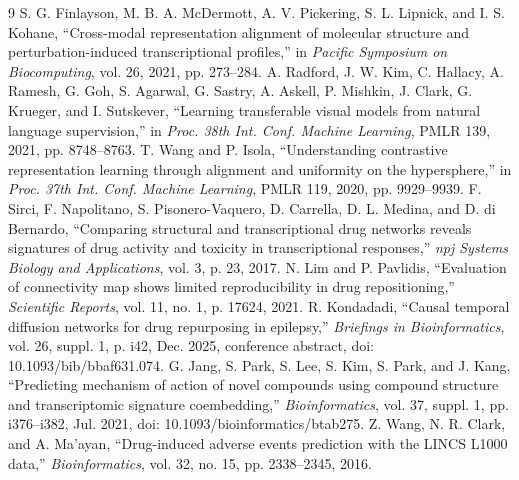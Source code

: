 \documentclass[conference]{IEEEtran}
\begin{document}
\begin{thebibliography}{9}
 S. G. Finlayson, M. B. A. McDermott, A. V. Pickering, S. L. Lipnick, and I. S. Kohane, ``Cross-modal representation alignment of molecular structure and perturbation-induced transcriptional profiles,'' in \emph{Pacific Symposium on Biocomputing}, vol. 26, 2021, pp. 273--284.
 A. Radford, J. W. Kim, C. Hallacy, A. Ramesh, G. Goh, S. Agarwal, G. Sastry, A. Askell, P. Mishkin, J. Clark, G. Krueger, and I. Sutskever, ``Learning transferable visual models from natural language supervision,'' in \emph{Proc. 38th Int. Conf. Machine Learning}, PMLR 139, 2021, pp. 8748--8763.
 T. Wang and P. Isola, ``Understanding contrastive representation learning through alignment and uniformity on the hypersphere,'' in \emph{Proc. 37th Int. Conf. Machine Learning}, PMLR 119, 2020, pp. 9929--9939.
 F. Sirci, F. Napolitano, S. Pisonero-Vaquero, D. Carrella, D. L. Medina, and D. di Bernardo, ``Comparing structural and transcriptional drug networks reveals signatures of drug activity and toxicity in transcriptional responses,'' \emph{npj Systems Biology and Applications}, vol. 3, p. 23, 2017.
 N. Lim and P. Pavlidis, ``Evaluation of connectivity map shows limited reproducibility in drug repositioning,'' \emph{Scientific Reports}, vol. 11, no. 1, p. 17624, 2021.
 R. Kondadadi, ``Causal temporal diffusion networks for drug repurposing in epilepsy,'' \emph{Briefings in Bioinformatics}, vol. 26, suppl. 1, p. i42, Dec. 2025, conference abstract, doi: 10.1093/bib/bbaf631.074.
 G. Jang, S. Park, S. Lee, S. Kim, S. Park, and J. Kang, ``Predicting mechanism of action of novel compounds using compound structure and transcriptomic signature coembedding,'' \emph{Bioinformatics}, vol. 37, suppl. 1, pp. i376--i382, Jul. 2021, doi: 10.1093/bioinformatics/btab275.
 Z. Wang, N. R. Clark, and A. Ma'ayan, ``Drug-induced adverse events prediction with the LINCS L1000 data,'' \emph{Bioinformatics}, vol. 32, no. 15, pp. 2338--2345, 2016.
\end{thebibliography}
\end{document}
